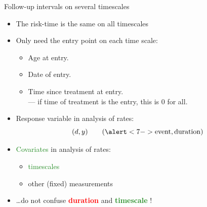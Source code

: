 \begin{frame}[fragile]{Follow-up intervals on several timescales}
  \begin{itemize}[<+->]
  \item The risk-time is the same on all timescales
  \item Only need the entry point on each time scale:

  \begin{itemize}
    \item Age at entry.
    \item Date of entry.
    \item Time since treatment at entry.\\
          --- if time of treatment is the entry, this is $0$ for all.
  \end{itemize}

  \item \alert<7->{Response variable} in analysis of rates:\\[-0.5ex]
\[ (d,y) \qquad (\alert<7->{\text{event}, \text{duration}}) \]

  \item \textcolor{forestgreen}{Covariates} in analysis of rates:

  \begin{itemize}[<+->]
    \item \textcolor{forestgreen}{timescales}
    \item other (fixed) measurements
  \end{itemize}
\item \ldots do not confuse  \textcolor{red}{\textbf{duration}} and
                     \textcolor{forestgreen}{\textbf{timescale}} !
  \end{itemize}
\end{frame}

